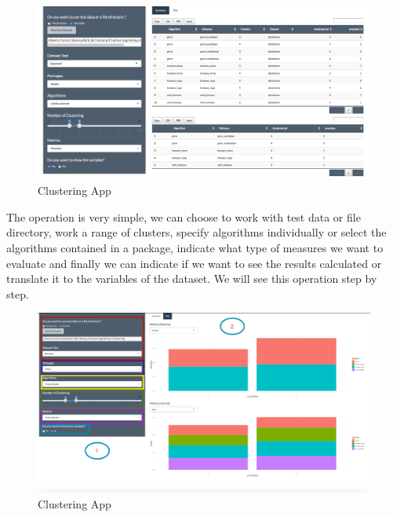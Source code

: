 \begin{figure}[htbp]
  \centering
   \includegraphics[width=14cm]{img/app}
    \caption{Clustering App}
    \label{fig:layoutApp}%
\end{figure}

The operation is very simple, we can choose to work with test data or file directory, work a range of clusters, specify algorithms individually or select the algorithms contained in a package, indicate what type of measures we want to evaluate and finally we can indicate if we want to see the results calculated or translate it to the variables of the dataset.
We will see this operation step by step.

\begin{figure}[htbp]
  \centering
   \includegraphics[width=14cm]{img/app1}
    \caption{Clustering App}
    \label{fig:layoutApp1}%
\end{figure}

